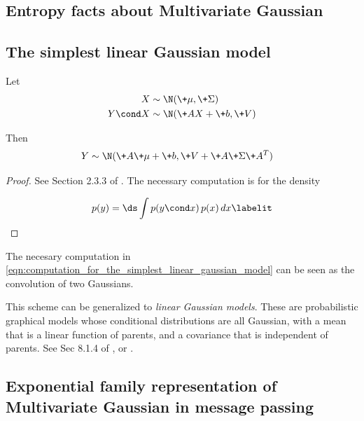 \documentclass{article} %
\begin{document}
\subsection{Entropy facts about Multivariate Gaussian}



\subsection{The simplest linear Gaussian model}

\begin{proposition}
\label{prop:simplest_linear_gaussian_model}
Let
\begin{align*}
X &\sim \N(\+\mu,  \+\Sigma) \\
Y \cond X &\sim \N(\+AX+\+b,  \+V) \\
\end{align*}

Then
\begin{align*}
Y &\sim \N(\+A \+\mu + \+b,  \+V + \+A \+\Sigma \+A^T)
\end{align*}
\end{proposition}

\begin{proof}
See Section 2.3.3 of \cite{bishop2006pattern}.    The necessary computation is for the density

\begin{align*}
p(y)  = \ds\int p(y \cond x) \,  p(x) \,  dx
\labelit \label{eqn:computation_for_the_simplest_linear_gaussian_model}
\end{align*}
\end{proof}


\begin{remark}
The necesary computation in \eqref{eqn:computation_for_the_simplest_linear_gaussian_model} can be seen as the convolution of two Gaussians.
\end{remark}


\begin{remark}
This scheme can be generalized to \textit{linear Gaussian models}.  These are probabilistic graphical models whose conditional distributions are all Gaussian,  with a mean that is a linear function of parents,  and a covariance that is independent of parents.   See Sec 8.1.4 of \cite{bishop2006pattern}, or \cite{roweis1999unifying}.   
\end{remark}


 \subsection{Exponential family representation of Multivariate Gaussian in message passing}
 \label{sec:mvn_in_message_passing}
 
\end{document}
